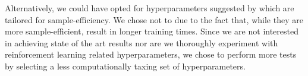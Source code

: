 Alternatively, we could have opted for hyperparameters suggested by \cite{efficientrainbow}
which are tailored for sample-efficiency.
We chose not to due to the fact that, while they are more sample-efficient,
result in longer training times.
Since we are not interested in achieving state of the art results nor
are we thoroughly experiment with reinforcement learning related hyperparameters,
we chose to perform more tests by selecting a less computationally taxing 
set of hyperparameters.

%


%
%
%
%



